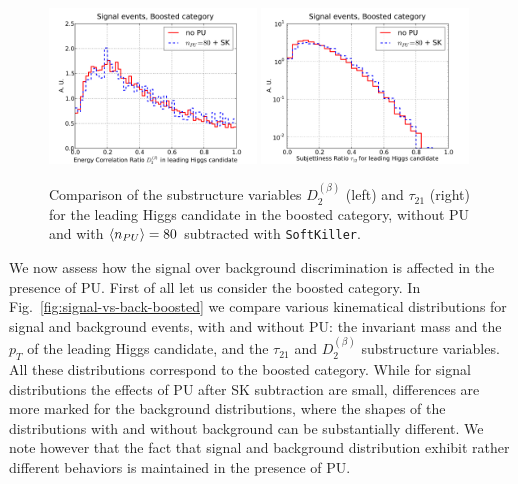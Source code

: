 \begin{figure}[t]
  \begin{center}
  \includegraphics[width=0.49\textwidth]{plots/D2_h0_bst_comp.pdf}
  \includegraphics[width=0.49\textwidth]{plots/tau21_h0_bst_comp.pdf}
   \caption{\small
     Comparison of the substructure variables $D_2^{(\beta)}$ (left)
     and $\tau_{21}$ (right)
     for the leading Higgs candidate in the boosted category,
   without PU and with $\left\langle n_{PU}\right\rangle=80$ subtracted with {\tt SoftKiller}.
}
\label{fig:Substructure_PU}
\end{center}
\end{figure}


%
We now assess how the signal over background discrimination is affected
in the presence of PU.
%
First of all let us consider the boosted category.
%
In Fig.~\ref{fig:signal-vs-back-boosted} we compare
various kinematical distributions for signal and background events,
     with and without PU: the invariant mass and the $p_T$ of the leading
     Higgs candidate, and the $\tau_{21}$ and $D^{(\beta)}_2$ substructure variables.
     All these distributions correspond to the boosted category.
     While for signal distributions the effects of PU after SK subtraction are small,
     differences are more marked for the background distributions, where
     the shapes of the distributions with and without background can be substantially
     different.
     We note however that the fact that signal and background distribution exhibit
     rather different behaviors is maintained in the presence of PU.
     

